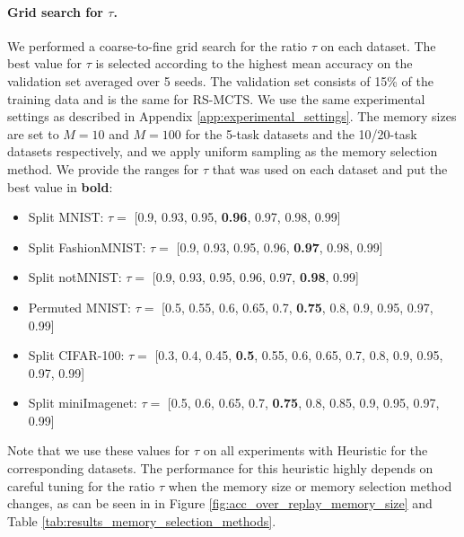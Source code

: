 \paragraph{Grid search for $\tau$.} We performed a coarse-to-fine grid search for the ratio $\tau$ on each dataset. The best value for $\tau$ is selected according to the highest mean accuracy on the validation set averaged over 5 seeds. The validation set consists of 15\% of the training data and is the same for RS-MCTS. We use the same experimental settings as described in Appendix \ref{app:experimental_settings}. The memory sizes are set to $M=10$ and $M=100$ for the 5-task datasets and the 10/20-task datasets respectively, and we apply uniform sampling as the memory selection method. We provide the ranges for $\tau$ that was used on each dataset and put the best value in \textbf{bold}:
\begin{itemize}[topsep=1pt]
    \item Split MNIST: $\tau =$ [0.9, 0.93, 0.95, \textbf{0.96}, 0.97, 0.98, 0.99]
    \item Split FashionMNIST: $\tau =$ [0.9, 0.93, 0.95, 0.96, \textbf{0.97}, 0.98, 0.99]
    \item Split notMNIST: $\tau =$ [0.9, 0.93, 0.95, 0.96, 0.97, \textbf{0.98}, 0.99]
    \item Permuted MNIST: $\tau =$ [0.5, 0.55, 0.6, 0.65, 0.7, \textbf{0.75}, 0.8, 0.9, 0.95, 0.97, 0.99]
    \item Split CIFAR-100: $\tau =$ [0.3, 0.4, 0.45, \textbf{0.5}, 0.55, 0.6, 0.65, 0.7, 0.8, 0.9, 0.95, 0.97, 0.99]
    \item  Split miniImagenet: $\tau =$ [0.5, 0.6, 0.65, 0.7, \textbf{0.75}, 0.8, 0.85, 0.9, 0.95, 0.97, 0.99]
\end{itemize}
Note that we use these values for $\tau$ on all experiments with Heuristic for the corresponding datasets. The performance for this heuristic highly depends on careful tuning for the ratio $\tau$ when the memory size or memory selection method changes, as can be seen in in Figure \ref{fig:acc_over_replay_memory_size} and Table \ref{tab:results_memory_selection_methods}. 

